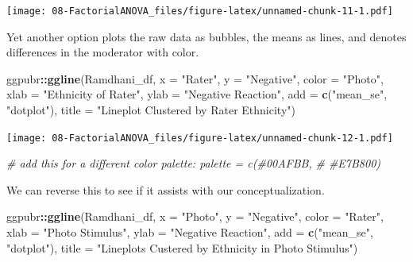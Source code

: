 \documentclass[
  11pt,
]{book}
\newenvironment{Shaded}{\begin{snugshade}}{\end{snugshade}}
\newcommand{\AttributeTok}[1]{\textcolor[rgb]{0.27,0.27,0.27}{#1}}
\newcommand{\CommentTok}[1]{\textcolor[rgb]{0.37,0.37,0.37}{\textit{#1}}}
\newcommand{\FunctionTok}[1]{\textcolor[rgb]{0.27,0.27,0.27}{\textbf{#1}}}
\newcommand{\NormalTok}[1]{#1}
\newcommand{\SpecialCharTok}[1]{\textcolor[rgb]{0.43,0.43,0.43}{\textbf{#1}}}
\newcommand{\StringTok}[1]{\textcolor[rgb]{0.5,0.5,0.5}{#1}}
\begin{document}
\texttt{[image: 08-FactorialANOVA\_files/figure-latex/unnamed-chunk-11-1.pdf]}

Yet another option plots the raw data as bubbles, the means as lines, and denotes differences in the moderator with color.

\begin{Shaded}
\begin{Highlighting}[]
\NormalTok{ggpubr}\SpecialCharTok{::}\FunctionTok{ggline}\NormalTok{(Ramdhani\_df, }\AttributeTok{x =} \StringTok{"Rater"}\NormalTok{, }\AttributeTok{y =} \StringTok{"Negative"}\NormalTok{, }\AttributeTok{color =} \StringTok{"Photo"}\NormalTok{,}
    \AttributeTok{xlab =} \StringTok{"Ethnicity of Rater"}\NormalTok{, }\AttributeTok{ylab =} \StringTok{"Negative Reaction"}\NormalTok{, }\AttributeTok{add =} \FunctionTok{c}\NormalTok{(}\StringTok{"mean\_se"}\NormalTok{,}
        \StringTok{"dotplot"}\NormalTok{), }\AttributeTok{title =} \StringTok{"Lineplot Clustered by Rater Ethnicity"}\NormalTok{)}
\end{Highlighting}
\end{Shaded}

\texttt{[image: 08-FactorialANOVA\_files/figure-latex/unnamed-chunk-12-1.pdf]}

\begin{Shaded}
\begin{Highlighting}[]
\CommentTok{\# add this for a different color palette: palette = c(\textquotesingle{}\#00AFBB\textquotesingle{},}
\CommentTok{\# \textquotesingle{}\#E7B800\textquotesingle{})}
\end{Highlighting}
\end{Shaded}

We can reverse this to see if it assists with our conceptualization.

\begin{Shaded}
\begin{Highlighting}[]
\NormalTok{ggpubr}\SpecialCharTok{::}\FunctionTok{ggline}\NormalTok{(Ramdhani\_df, }\AttributeTok{x =} \StringTok{"Photo"}\NormalTok{, }\AttributeTok{y =} \StringTok{"Negative"}\NormalTok{, }\AttributeTok{color =} \StringTok{"Rater"}\NormalTok{,}
    \AttributeTok{xlab =} \StringTok{"Photo Stimulus"}\NormalTok{, }\AttributeTok{ylab =} \StringTok{"Negative Reaction"}\NormalTok{, }\AttributeTok{add =} \FunctionTok{c}\NormalTok{(}\StringTok{"mean\_se"}\NormalTok{,}
        \StringTok{"dotplot"}\NormalTok{), }\AttributeTok{title =} \StringTok{"Lineplots Custered by Ethnicity in Photo Stimulus"}\NormalTok{)}
\end{Highlighting}
\end{Shaded}
\end{document}
